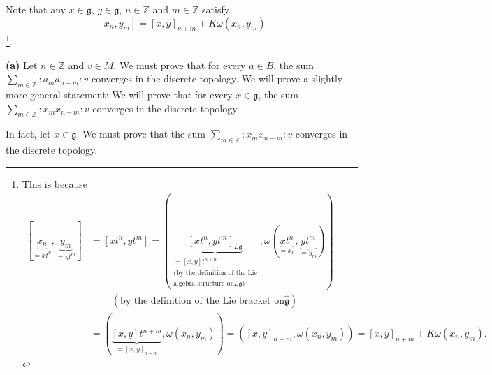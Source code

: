 \documentclass[etingof-lie.tex]{subfiles}
\begin{document}
Note that any $x\in\mathfrak{g}$, $y\in\mathfrak{g}$, $n\in\mathbb{Z}$ and
$m\in\mathbb{Z}$ satisfy%
\begin{equation}
\left[  x_{n},y_{m}\right]  =\left[  x,y\right]  _{n+m}+K\omega\left(
x_{n},y_{m}\right)  \label{pf.sugawara.lie}%
\end{equation}
\footnote{This is because%
\begin{align*}
\left[  \underbrace{x_{n}}_{=xt^{n}},\underbrace{y_{m}}_{=yt^{m}}\right]   &
=\left[  xt^{n},yt^{m}\right]  =\left(  \underbrace{\left[  xt^{n}%
,yt^{m}\right]  _{L\mathfrak{g}}}_{\substack{=\left[  x,y\right]
t^{n+m}\\\text{(by the definition of the Lie}\\\text{algebra structure on
}L\mathfrak{g}\text{)}}},\omega\left(  \underbrace{xt^{n}}_{=x_{n}%
},\underbrace{yt^{m}}_{=y_{m}}\right)  \right) \\
&  \ \ \ \ \ \ \ \ \ \ \left(  \text{by the definition of the Lie bracket on
}\widehat{\mathfrak{g}}\right) \\
&  =\left(  \underbrace{\left[  x,y\right]  t^{n+m}}_{=\left[  x,y\right]
_{n+m}},\omega\left(  x_{n},y_{m}\right)  \right)  =\left(  \left[
x,y\right]  _{n+m},\omega\left(  x_{n},y_{m}\right)  \right)  =\left[
x,y\right]  _{n+m}+K\omega\left(  x_{n},y_{m}\right)  .
\end{align*}
}.

\textbf{(a)} Let $n\in\mathbb{Z}$ and $v\in M$. We must prove that for every
$a\in B$, the sum $\sum\limits_{m\in\mathbb{Z}}\left.  :a_{m}a_{n-m}:\right.
v$ converges in the discrete topology. We will prove a slightly more general
statement: We will prove that for every $x\in\mathfrak{g}$, the sum
$\sum\limits_{m\in\mathbb{Z}}\left.  :x_{m}x_{n-m}:\right.  v$ converges in
the discrete topology.

In fact, let $x\in\mathfrak{g}$. We must prove that the sum $\sum
\limits_{m\in\mathbb{Z}}\left.  :x_{m}x_{n-m}:\right.  v$ converges in the
discrete topology.
\end{document}
